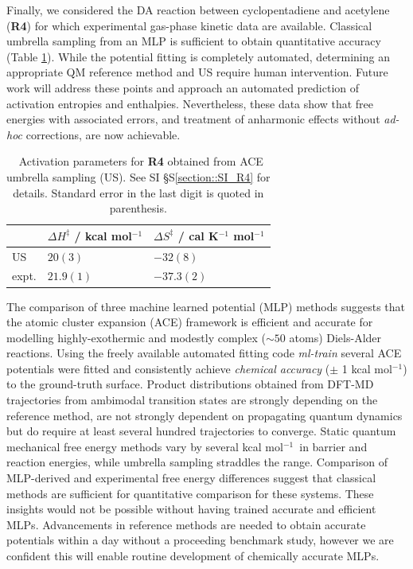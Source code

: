 \documentclass[twoside,twocolumn,9pt]{article}
\newcommand{\kcal}{kcal mol$^{-1}$}
\begin{document}
Finally, we considered the DA reaction between cyclopentadiene and acetylene ({\bfseries{R4}}) for which experimental gas-phase kinetic data are available.\cite{Walsh1975} Classical umbrella sampling from an MLP is sufficient to obtain quantitative accuracy (Table \ref{tbl::X1}). While the potential fitting is completely automated, determining an appropriate QM reference method and US require human intervention. Future work will address these points and approach an automated prediction of activation entropies and enthalpies. Nevertheless, these data show that free energies with associated errors, and treatment of anharmonic effects without \emph{ad-hoc} corrections, are now achievable.


\begin{table}[h]
	\small
	\caption{\ Activation parameters for {\bfseries{R4}} obtained from ACE umbrella sampling (US). See SI §S\ref{section::SI_R4} for details. Standard error in the last digit is quoted in parenthesis.}
	\label{tbl::X1}
	\vspace{-0.2cm}
	\renewcommand{\arraystretch}{1.4}
	\begin{tabular*}{0.48\textwidth}{@{\extracolsep{\fill}}lll}
		\hline
		 & $\Delta H^\ddagger$ / \kcal & $\Delta S^\ddagger$ / cal K${}^{-1}$ mol$^{-1}$ \\
		\hline
		US & $20(3)$ & $-32(8)$ \\
		expt.\cite{Walsh1975} & $21.9(1)$ & $-37.3(2)$ \\
		\hline
	\end{tabular*}
\end{table}




\vspace{0.2cm}
The comparison of three machine learned potential (MLP) methods suggests that the atomic cluster expansion (ACE) framework is efficient and accurate for modelling highly-exothermic and modestly complex ($\sim 50$ atoms) Diels-Alder reactions. Using the freely available automated fitting code \emph{ml-train}\cite{Young2021mlt} several ACE potentials were fitted and consistently achieve \emph{chemical accuracy} ($\pm$ 1 \kcal) to the ground-truth surface. Product distributions obtained from DFT-MD trajectories from ambimodal transition states are strongly depending on the reference method, are not strongly dependent on propagating quantum dynamics but do require at least several hundred trajectories to converge. Static quantum mechanical free energy methods vary by several \kcal~in barrier and reaction energies, while umbrella sampling straddles the range. Comparison of MLP-derived and experimental free energy differences suggest that classical methods are sufficient for quantitative comparison for these systems. These insights would not be possible without having trained accurate and efficient MLPs. Advancements in reference methods are needed to obtain accurate potentials within a day without a proceeding benchmark study, however we are confident this will enable routine development of chemically accurate MLPs.
\end{document}
